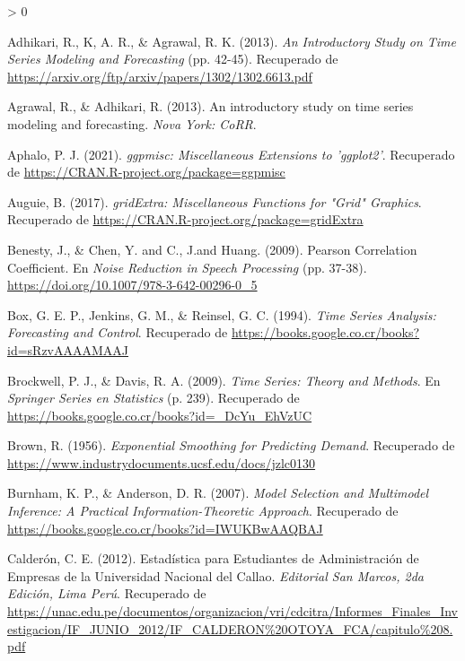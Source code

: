 \documentclass[
]{article}
\newlength{\cslhangindent}
\newenvironment{CSLReferences}[2] %
 {%
  \setlength{\parindent}{0pt}
  \ifodd #1 \everypar{\setlength{\hangindent}{\cslhangindent}}\ignorespaces\fi
  \ifnum #2 > 0
  \setlength{\parskip}{#2\baselineskip}
  \fi
 }%
 {}
\begin{document}
\hypertarget{refs}{}
\begin{CSLReferences}{1}{0}
\leavevmode\hypertarget{ref-medidas}{}%
Adhikari, R., K, A. R., \& Agrawal, R. K. (2013). \emph{An Introductory
Study on Time Series Modeling and Forecasting} (pp. 42-45). Recuperado
de \url{https://arxiv.org/ftp/arxiv/papers/1302/1302.6613.pdf}

\leavevmode\hypertarget{ref-stationary_def}{}%
Agrawal, R., \& Adhikari, R. (2013). An introductory study on time
series modeling and forecasting. \emph{Nova York: CoRR}.

\leavevmode\hypertarget{ref-ggpmisc}{}%
Aphalo, P. J. (2021). \emph{ggpmisc: Miscellaneous Extensions to
'ggplot2'}. Recuperado de
\url{https://CRAN.R-project.org/package=ggpmisc}

\leavevmode\hypertarget{ref-gridExtra}{}%
Auguie, B. (2017). \emph{gridExtra: Miscellaneous Functions for "Grid"
Graphics}. Recuperado de
\url{https://CRAN.R-project.org/package=gridExtra}

\leavevmode\hypertarget{ref-pearson}{}%
Benesty, J., \& Chen, Y. and C., J.and Huang. (2009). Pearson
Correlation Coefficient. En \emph{Noise Reduction in Speech Processing}
(pp. 37-38). \url{https://doi.org/10.1007/978-3-642-00296-0_5}

\leavevmode\hypertarget{ref-box-jenkins}{}%
Box, G. E. P., Jenkins, G. M., \& Reinsel, G. C. (1994). \emph{Time
Series Analysis: Forecasting and Control}. Recuperado de
\url{https://books.google.co.cr/books?id=sRzvAAAAMAAJ}

\leavevmode\hypertarget{ref-yule.walker}{}%
Brockwell, P. J., \& Davis, R. A. (2009). \emph{Time Series: Theory and
Methods}. En \emph{Springer Series en Statistics} (p. 239). Recuperado
de \url{https://books.google.co.cr/books?id=_DcYu_EhVzUC}

\leavevmode\hypertarget{ref-brown}{}%
Brown, R. (1956). \emph{Exponential Smoothing for Predicting Demand}.
Recuperado de \url{https://www.industrydocuments.ucsf.edu/docs/jzlc0130}

\leavevmode\hypertarget{ref-burnham2007model}{}%
Burnham, K. P., \& Anderson, D. R. (2007). \emph{Model Selection and
Multimodel Inference: A Practical Information-Theoretic Approach}.
Recuperado de \url{https://books.google.co.cr/books?id=IWUKBwAAQBAJ}

\leavevmode\hypertarget{ref-calderon2012estadistica}{}%
Calderón, C. E. (2012). Estadística para Estudiantes de Administración
de Empresas de la Universidad Nacional del Callao. \emph{Editorial San
Marcos, 2da Edición, Lima Perú}. Recuperado de
\url{https://unac.edu.pe/documentos/organizacion/vri/cdcitra/Informes_Finales_Investigacion/IF_JUNIO_2012/IF_CALDERON\%20OTOYA_FCA/capitulo\%208.pdf}


\end{CSLReferences}
\end{document}
